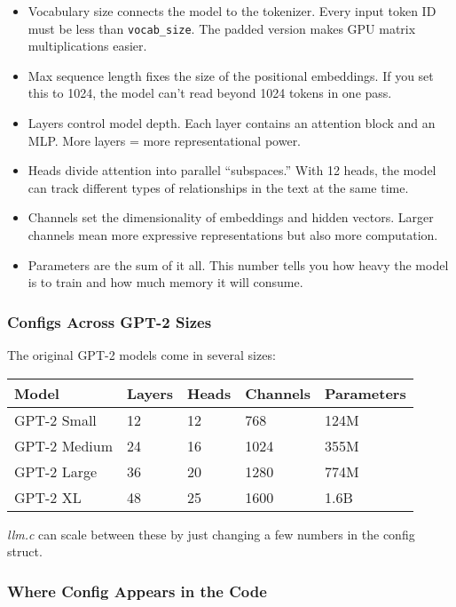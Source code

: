 \documentclass[
  letterpaper,
  DIV=11,
  numbers=noendperiod]{scrreprt}
\providecommand{\tightlist}{%
  \setlength{\itemsep}{0pt}\setlength{\parskip}{0pt}}
\begin{document}
\begin{itemize}
\tightlist
\item
  Vocabulary size connects the model to the tokenizer. Every input token
  ID must be less than \texttt{vocab\_size}. The padded version makes
  GPU matrix multiplications easier.
\item
  Max sequence length fixes the size of the positional embeddings. If
  you set this to 1024, the model can't read beyond 1024 tokens in one
  pass.
\item
  Layers control model depth. Each layer contains an attention block and
  an MLP. More layers = more representational power.
\item
  Heads divide attention into parallel ``subspaces.'' With 12 heads, the
  model can track different types of relationships in the text at the
  same time.
\item
  Channels set the dimensionality of embeddings and hidden vectors.
  Larger channels mean more expressive representations but also more
  computation.
\item
  Parameters are the sum of it all. This number tells you how heavy the
  model is to train and how much memory it will consume.
\end{itemize}

\subsubsection{Configs Across GPT-2
Sizes}\label{configs-across-gpt-2-sizes}

The original GPT-2 models come in several sizes:

\begin{longtable}[]{@{}lllll@{}}
\toprule\noalign{}
Model & Layers & Heads & Channels & Parameters \\
\midrule\noalign{}
\endhead
\bottomrule\noalign{}
\endlastfoot
GPT-2 Small & 12 & 12 & 768 & 124M \\
GPT-2 Medium & 24 & 16 & 1024 & 355M \\
GPT-2 Large & 36 & 20 & 1280 & 774M \\
GPT-2 XL & 48 & 25 & 1600 & 1.6B \\
\end{longtable}

\emph{llm.c} can scale between these by just changing a few numbers in
the config struct.

\subsubsection{Where Config Appears in the
Code}\label{where-config-appears-in-the-code}
\end{document}
